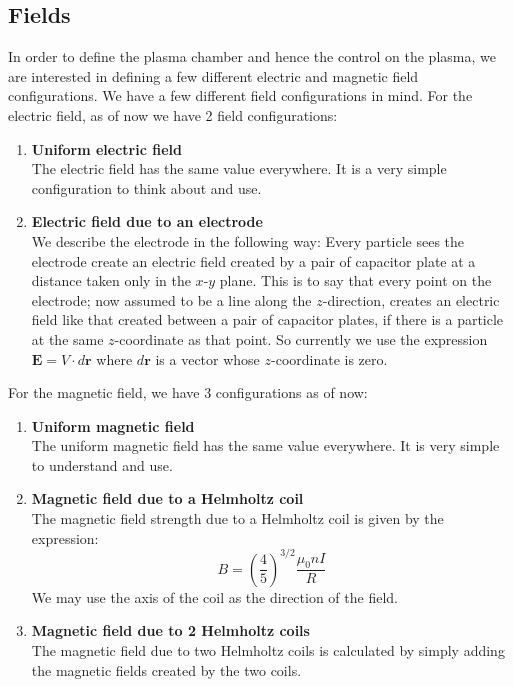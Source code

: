 \documentclass[12pt]{article}
\begin{document}
	\subsection{Fields}
	In order to define the plasma chamber and hence the control on the plasma, we are interested in defining a few different electric and magnetic field configurations. We have a few different field configurations in mind. For the electric field, as of now we have 2 field configurations:
	\begin{enumerate}
		\item \textbf{Uniform electric field} \\
		The electric field has the same value everywhere. It is a very simple configuration to think about and use.
		\item \textbf{Electric field due to an electrode} \\
		We describe the electrode in the following way: Every particle sees the electrode create an electric field created by a pair of capacitor plate at a distance taken only in the $x$-$y$ plane. This is to say that every point on the electrode; now assumed to be a line along the $z$-direction, creates an electric field like that created between a pair of capacitor plates, if there is a particle at the same $z$-coordinate as that point. So currently we use the expression $\mathbf{E} = V \cdot d\boldsymbol{r}$ where $d\boldsymbol{r}$ is a vector whose $z$-coordinate is zero.
		
	\end{enumerate}
	For the magnetic field, we have 3 configurations as of now:
	\begin{enumerate}
		\item \textbf{Uniform magnetic field} \\
		The uniform magnetic field has the same value everywhere. It is very simple to understand and use.
		\item \textbf{Magnetic field due to a Helmholtz coil} \\
		The magnetic field strength due to a Helmholtz coil is given by the expression:
		$$B = \left(\frac{4}{5}\right)^{3/2} \frac{\mu_{0} n I}{R}$$
		We may use the axis of the coil as the direction of the field.
		\item \textbf{Magnetic field due to 2 Helmholtz coils} \\
		The magnetic field due to two Helmholtz coils is calculated by simply adding the magnetic fields created by the two coils.
	\end{enumerate}
	
\end{document}
